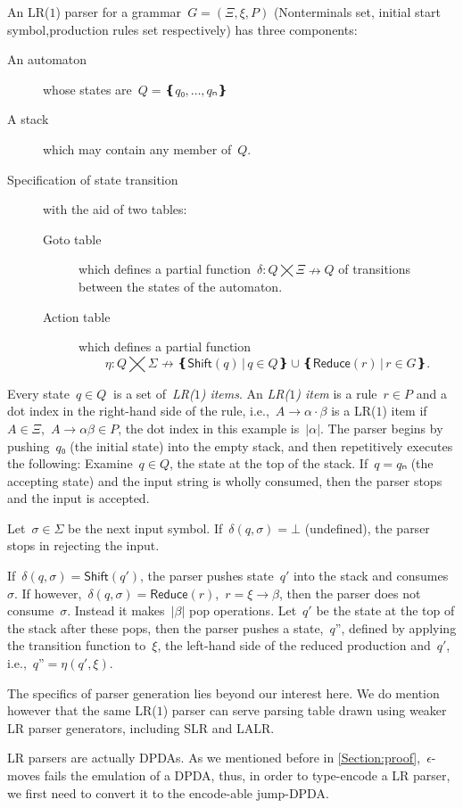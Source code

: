 An LR($1$) parser for a grammar~$G=(Ξ,ξ,P)$ (Nonterminals set, initial start symbol,production rules set respectively)
  has three components:
\begin{description}
  \item[An automaton] whose states are~$Q=❴q₀,…,qₙ❵$
  \item[A stack] which may contain any member of~$Q$.
  \item[Specification of state transition] with the aid of two tables:
  \begin{description}
    \item[Goto table] which defines a partial function~$δ:Q⨉Ξ↛Q$ of transitions
    between the states of the automaton.
    \item[Action table] which
    defines a partial function\[η:Q⨉Σ↛ ❴ \textsf{Shift}(q) \,|\, q∈Q❵ ∪ ❴\textsf{Reduce}(r) \,| \, r∈G❵.\]
  \end{description}
\end{description}
Every state~$q∈Q~$ is a set of~\emph{LR($1$) items}.
  An \emph{LR($1$) item} is a rule~$r∈P$ and a dot index in the right-hand side of the rule,
  i.e.,~$A→α·β$ is a LR($1$) item if~$A∈Ξ$,~$A→αβ∈P$,
  the dot index in this example is~$|α|$.
The parser begins by pushing~$q₀$ (the initial state) into the empty stack,
and then repetitively executes the following:
Examine~$q∈Q$, the state at the top of the stack.
If~$q=qₙ$ (the accepting state) and the input string is wholly consumed, then the parser stops and the input is accepted.

Let~$σ∈Σ$ be the next input symbol.
If~$δ(q,σ)=⊥$ (undefined), the parser stops in rejecting the input.

If~$δ(q,σ) = \textsf{Shift}(q')$, the parser pushes state~$q'$
into the stack and consumes~$σ$.
If however,~$δ(q,σ) = \textsf{Reduce}(r)$,~$r=ξ→β$,
then the parser does not consume~$σ$.
Instead it makes~$|β|$ pop operations.
Let~$q'$ be the state at the top of the stack after these pops, then
the parser pushes a state,~$q”$,
defined by applying the transition function to~$ξ$, the left-hand side of the reduced production and~$q'$,
i.e.,~$q”=η(q',ξ)$.

The specifics of parser generation lies beyond our interest here.
We do mention however that the same LR($1$) parser can serve parsing table drawn using weaker LR parser generators,
including SLR and LALR\@.

LR parsers are actually DPDAs\@. As we mentioned before in \cref{Section:proof},~$\epsilon$-moves 
  fails the emulation of a DPDA, thus, in order to type-encode a LR parser, we first need 
  to convert it to the encode-able jump-DPDA\@.

